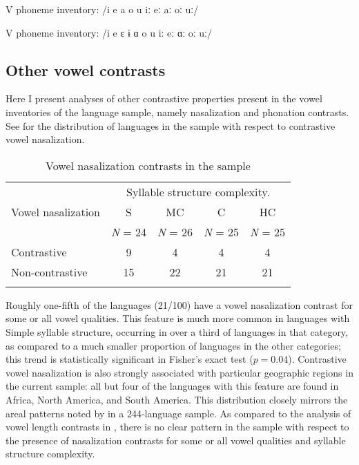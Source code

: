 \ea\label{ex:4.13}
   \begin{Coding}
\item[V phoneme inventory:] /i e a o u iː eː aː oː uː/
   \end{Coding}
\z

\ea\label{ex:4.14}
\begin{Coding}
\item[V phoneme inventory:] /i e ɛ ɨ ɑ o u iː eː ɑː oː uː/
   \end{Coding}
\z

\subsection{Other vowel contrasts}\label{sec:4.3.3}

  Here I present analyses of other contrastive properties present in the vowel inventories of the language sample, namely nasalization and phonation contrasts. See  for the distribution of languages in the sample with respect to contrastive vowel nasalization.

\begin{table}
\begin{tabular}{lcccc}
\lsptoprule
 & \multicolumn{4}{c}{Syllable structure complexity.}\\\cmidrule(lr){2-5}
Vowel nasalization & S & MC & C & HC\\
             & \textit{N} = 24 & \textit{N} = 26 & \textit{N} = 25 & \textit{N} = 25\\\midrule
{Contrastive} & 9 & 4 & 4 & 4\\
{Non-contrastive} & 15 & 22 & 21 & 21\\
\lspbottomrule
\end{tabular}
\caption{\label{tab:4.4}Vowel nasalization contrasts in the sample}
\end{table}

  Roughly one-fifth of the languages (21/100) have a vowel nasalization contrast for some or all vowel qualities. This feature is much more common in languages with Simple syllable structure, occurring in over a third of languages in that category, as compared to a much smaller proportion of languages in the other categories; this trend is statistically significant in Fisher’s exact test ($p = 0.04$). Contrastive vowel nasalization is also strongly associated with particular geographic regions in the current sample: all but four of the languages with this feature are found in Africa, North America, and South America. This distribution closely mirrors the areal patterns noted by \citet{Hajek2013} in a 244-language sample. As compared to the analysis of vowel length contrasts in , there is no clear pattern in the sample with respect to the presence of nasalization contrasts for some or all vowel qualities and syllable structure complexity.

